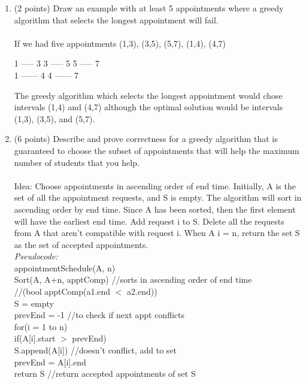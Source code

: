 \documentclass[12pt]{article}
\begin{document}
\begin{enumerate}
\begin{enumerate}
\pagebreak
\item \label{1b} (2 points) Draw an example with at least 5 appointments where a greedy algorithm
    that selects the longest appointment will fail.
\\
\\ If we had five appointments {(1,3), (3,5), (5,7), (1,4), (4,7)} \\
\begin{center} 1 ----- 3 3 ----- 5 5 ----- 7 \\ 1 ------ 4 4 ------ 7 \end{center}
 The greedy algorithm which selects the longest appointment would chose intervals (1,4) and (4,7) although the optimal solution would be intervals (1,3), (3,5), and (5,7).
\pagebreak
\item \label{1c} (6 points) Describe and prove correctness for a greedy algorithm that is guaranteed
    to choose the subset of appointments that will help the maximum number of
    students that you help.
\\
\\ Idea: Choose appointments in ascending order of end time. Initially, A is the set of all the appointment requests, and S is empty. The algorithm will sort in ascending order by end time. Since A has been sorted, then the first element will have the earliest end time. Add request i to S. Delete all the requests from A that aren't compatible with request i. When A i = n, return the set S as the set of accepted appointments.\\ 
\textit{Pseudocode:} \\
appointmentSchedule(A, n)\\
\hspace*{10mm} Sort(A, A+n, apptComp) \hspace*{10mm} //sorts in ascending order of end time \\
\hspace*{65mm} //(bool apptComp(a1.end $<$ a2.end))\\
\hspace*{10mm} S = empty \\ 
\hspace*{10mm} prevEnd = -1 \hspace*{30mm} //to check if next appt conflicts \\
\hspace*{10mm} for(i = 1 to n)\\
\hspace*{15mm} if(A[i].start $>$ prevEnd) \\
\hspace*{20mm} S.append(A[i]) \hspace*{15mm} //doesn't conflict, add to set \\
\hspace*{20mm} prevEnd = A[i].end \\
\hspace*{10mm} return S \hspace*{35mm} //return accepted appointments of set S \\


\end{enumerate}
\end{enumerate}
\end{document}
